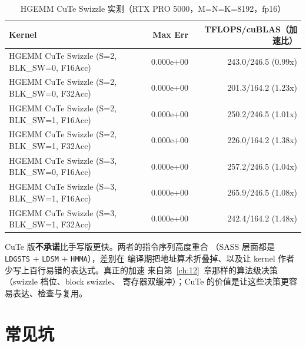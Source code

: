 \begin{table}[H]
\centering
\caption{HGEMM CuTe Swizzle 实测（RTX PRO 5000，M=N=K=8192，fp16）}
\label{tab:ch24-perf}
\footnotesize
\setlength{\tabcolsep}{4pt}
\begin{tabular}{lrr}
\toprule
Kernel & Max Err & TFLOPS/cuBLAS（加速比） \\
\midrule
HGEMM CuTe Swizzle (S=2, BLK\_SW=0, F16Acc) & 0.000e+00 & 243.0/246.5 (0.99x) \\
HGEMM CuTe Swizzle (S=2, BLK\_SW=0, F32Acc) & 0.000e+00 & 201.3/164.2 (1.23x) \\
HGEMM CuTe Swizzle (S=2, BLK\_SW=1, F16Acc) & 0.000e+00 & 250.2/246.5 (1.01x) \\
HGEMM CuTe Swizzle (S=2, BLK\_SW=1, F32Acc) & 0.000e+00 & 226.0/164.2 (1.38x) \\
HGEMM CuTe Swizzle (S=3, BLK\_SW=0, F16Acc) & 0.000e+00 & 257.2/246.5 (1.04x) \\
HGEMM CuTe Swizzle (S=3, BLK\_SW=1, F16Acc) & 0.000e+00 & 265.9/246.5 (1.08x) \\
HGEMM CuTe Swizzle (S=3, BLK\_SW=1, F32Acc) & 0.000e+00 & 242.4/164.2 (1.48x) \\
\bottomrule
\end{tabular}
\end{table}

CuTe 版\textbf{不承诺}比手写版更快。两者的指令序列高度重合
（SASS 层面都是 \texttt{LDGSTS} $+$ \texttt{LDSM} $+$ \texttt{HMMA}），差别在
编译期把地址算术折叠掉、以及让 kernel 作者少写上百行易错的表达式。真正的加速
来自第~\ref{ch:12}~章那样的算法级决策（swizzle 档位、block swizzle、
寄存器双缓冲）；CuTe 的价值是让这些决策更容易表达、检查与复用。

\section{常见坑}

